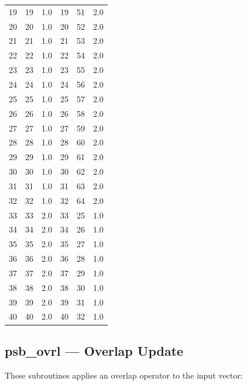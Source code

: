 \begin{table}
\begin{center}
\begin{tabular}{rrr@{\hspace{6\tabcolsep}}rrr}
 19   &   19  &  1.0   &  19  &  51  &   2.0 \\
 20   &   20  &  1.0   &  20  &  52  &   2.0 \\ 
21   &   21  &  1.0   &  21  &  53  &   2.0 \\
22   &   22  &  1.0   &  22  &  54  &   2.0 \\
23   &   23  &  1.0   &  23  &  55  &   2.0 \\
24   &   24  &  1.0   &  24  &  56  &   2.0 \\
25   &   25  &  1.0   &  25  &  57  &   2.0 \\
26   &   26  &  1.0   &  26  &  58  &   2.0 \\
27   &   27  &  1.0   &  27  &  59  &   2.0 \\
28   &   28  &  1.0   &  28  &  60  &   2.0 \\
29   &   29  &  1.0   &  29  &  61  &   2.0 \\
30   &   30  &  1.0   &  30  &  62  &   2.0 \\
31   &   31  &  1.0   &  31  &  63  &   2.0 \\
32   &   32  &  1.0   &  32  &  64  &   2.0 \\
33   &   33  &  2.0   &  33  &  25  &   1.0 \\
34   &   34  &  2.0   &  34  &  26  &   1.0 \\
35   &   35  &  2.0   &  35  &  27  &   1.0 \\
36   &   36  &  2.0   &  36  &  28  &   1.0 \\
37   &   37  &  2.0   &  37  &  29  &   1.0 \\
38   &   38  &  2.0   &  38  &  30  &   1.0 \\
39   &   39  &  2.0   &  39  &  31  &   1.0 \\
40   &   40  &  2.0   &  40  &  32  &   1.0 \\
\end{tabular}
\end{center}
\end{table}

%
%


\clearpage\subsection*{psb\_ovrl --- Overlap Update}

These subroutines applies an overlap operator to the input vector:

